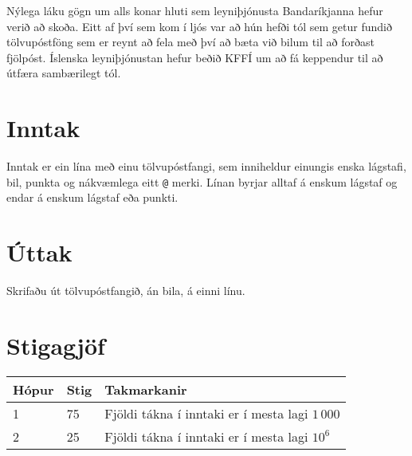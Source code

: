 
Nýlega láku gögn um alls konar hluti sem leyniþjónusta Bandaríkjanna hefur verið að skoða.
Eitt af því sem kom í ljós var að hún hefði tól sem getur fundið tölvupóstföng sem er reynt að fela með því að bæta við bilum til að forðast fjölpóst.
Íslenska leyniþjónustan hefur beðið KFFÍ um að fá keppendur til að útfæra sambærilegt tól.

\section*{Inntak}
Inntak er ein lína með einu tölvupóstfangi, sem inniheldur einungis enska lágstafi, bil, punkta og nákvæmlega eitt \texttt{@} merki.
Línan byrjar alltaf á enskum lágstaf og endar á enskum lágstaf eða punkti.

\section*{Úttak}
Skrifaðu út tölvupóstfangið, án bila, á einni línu.

\section*{Stigagjöf}
\begin{tabular}{|l|l|l|}
\hline
Hópur & Stig & Takmarkanir \\ \hline
1     & 75   & Fjöldi tákna í inntaki er í mesta lagi $1\,000$ \\ \hline
2     & 25   & Fjöldi tákna í inntaki er í mesta lagi $10^6$ \\ \hline
\end{tabular}

